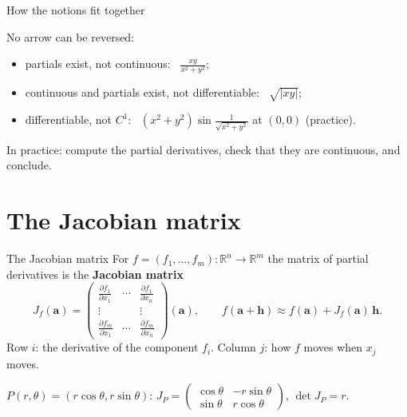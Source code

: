 \documentclass[10pt]{wosm-slides}
\newcommand{\R}{\mathbb{R}}
\newcommand{\va}{\mathbf{a}}
\newcommand{\vh}{\mathbf{h}}
\newcommand{\pd}[2]{\frac{\partial #1}{\partial #2}}
\begin{document}
\begin{frame}{How the notions fit together}
  \begin{center}
  \end{center}
  \pause
  No arrow can be reversed:
  \begin{itemize}
    \item partials exist, not continuous: \ $\frac{xy}{x^2 + y^2}$;
    \item continuous and partials exist, not differentiable: \ $\sqrt{|xy|}$;
    \item differentiable, not $C^1$: \ $(x^2 + y^2)\sin\frac{1}{\sqrt{x^2 + y^2}}$ at $(0, 0)$
      (practice).
  \end{itemize}
  In practice: compute the partial derivatives, check that they are continuous, and conclude.
\end{frame}

\section{The Jacobian matrix}

\begin{frame}{The Jacobian matrix}
  For $f = (f_1, \dots, f_m)\colon \R^n \to \R^m$ the matrix of partial derivatives is the
  \textbf{Jacobian matrix}
  \[ J_f(\va) = \begin{pmatrix}
       \pd{f_1}{x_1} & \cdots & \pd{f_1}{x_n} \\
       \vdots & & \vdots \\
       \pd{f_m}{x_1} & \cdots & \pd{f_m}{x_n}
     \end{pmatrix}(\va) , \qquad
     f(\va + \vh) \approx f(\va) + J_f(\va)\,\vh . \]
  Row $i$: the derivative of the component $f_i$. Column $j$: how $f$ moves when $x_j$ moves.
  \pause
  \begin{example}
    $P(r, \theta) = (r\cos\theta, r\sin\theta)$: \quad
    $J_P = \begin{pmatrix} \cos\theta & -r\sin\theta \\ \sin\theta & r\cos\theta \end{pmatrix}$, \quad
    $\det J_P = r$.
  \end{example}
\end{frame}
\end{document}
